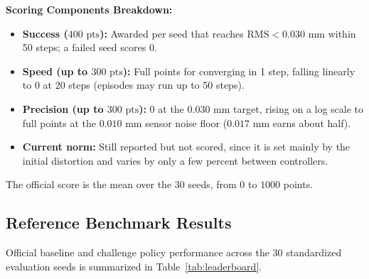 \documentclass[11pt,a4paper]{article}
\begin{document}
\noindent\textbf{Scoring Components Breakdown:}
\begin{itemize}
    \item \textbf{Success ($400\text{ pts}$):} Awarded per seed that reaches $\text{RMS} < 0.030\text{ mm}$ within 50 steps; a failed seed scores $0$.
    \item \textbf{Speed (up to $300\text{ pts}$):} Full points for converging in 1 step, falling linearly to $0$ at 20 steps (episodes may run up to 50 steps).
    \item \textbf{Precision (up to $300\text{ pts}$):} $0$ at the $0.030\text{ mm}$ target, rising on a log scale to full points at the $0.010\text{ mm}$ sensor noise floor ($0.017\text{ mm}$ earns about half).
    \item \textbf{Current norm:} Still reported but not scored, since it is set mainly by the initial distortion and varies by only a few percent between controllers.
\end{itemize}
The official score is the mean over the 30 seeds, from $0$ to $1000$ points.

\subsection{Reference Benchmark Results}
Official baseline and challenge policy performance across the 30 standardized evaluation seeds is summarized in Table~\ref{tab:leaderboard}.

\begin{table}[h!]
\centering
{}
\caption{Official benchmark results across 30 evaluation seeds.}
\label{tab:leaderboard}
\end{table}
\end{document}
